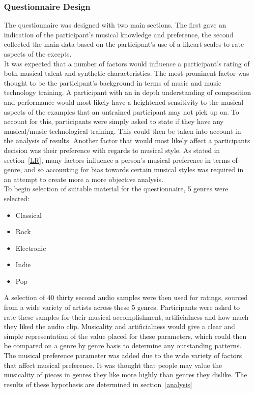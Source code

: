 \documentclass[titlepage]{scrartcl}
\begin{document}
    \subsubsection{Questionnaire Design}
    The questionnaire was designed with two main sections. The first gave an
    indication of the participant's musical knowledge and preference, the second
    collected the main data based on the participant's use of a likeart scales
    to rate aspects of the excepts.\\
    It was expected that a number of factors would influence a participant's
    rating of both musical talent and synthetic characteristics. The most
    prominent factor was thought to be the participant's background in terms of
    music and music technology training. A participant with an in depth
    understanding of composition and performance would most likely have a
    heightened sensitivity to the musical aspects of the examples that an
    untrained participant may not pick up on. To account for this, participants
    were simply asked to state if they have any musical/music technological
    training. This could then be taken into account in the analysis of results.
    Another factor that would most likely affect a participants decision was
    their preference with regards to musical style. As stated in
    section~\ref{LR}, many factors influence a person's musical preference in
    terms of genre, and so accounting for bias towards certain musical styles
    was required in an attempt to create more a more objective analysis.\\

    To begin selection of suitable material for the questionnaire, 5 genres were selected:
    \begin{itemize}
        \item Classical
        \item Rock
        \item Electronic
        \item Indie
        \item Pop
    \end{itemize}
    A selection of 40 thirty second audio samples were then used for ratings,
    sourced from a wide variety of artists across these 5 genres.
    Participants were asked to rate these samples for their musical
    accomplishment, artificialness and how much they liked the audio clip.
    Musicality and artificialness would give a clear and simple representation
    of the value placed for these parameters, which could then be compared on a
    genre by genre basis to determine any outstanding patterns. The musical
    preference parameter was added due to the wide variety of factors that
    affect musical preference. It was thought that people may value the
    musicality of pieces in genres they like more highly than genres they
    dislike. The results of these hypothesis are determined in section~\ref{analysis}\\
    
\end{document}
